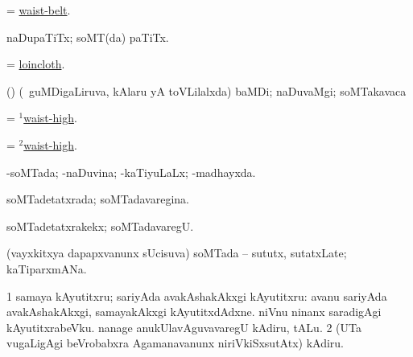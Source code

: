 \bentry
{} 
\gl{\nA}
\expl{}
\bmng
= \hyperlink{waist-belt}{waist-belt}. 
\emng
\eentry

\bentry
{} 
\gl{\nA}
\expl{}
\bmng
naDupaTiTx; soMT(da) paTiTx. 
\emng
\eentry

\bentry
{} 
\gl{\nA}
\expl{}
\bmng
= \hyperref{kandict_l.pdf}{L}{loincloth}{loincloth}. 
\emng
\eentry

\bentry
{} 
\gl{\nA}
\expl{}
\bmng
(\birx) (\sA\ guMDigaLiruva, kAlaru yA toVLilalxda) baMDi; naDuvaMgi; soMTakavaca 
\emng
\eentry

\bentry
{} 
\gl{\gu}
\expl{}
\bmng
= \hyperlink{waist-high(1)}{$^1$waist-high}. 
\emng
\eentry

\bentry
{} 
\gl{\kirxvi}
\expl{}
\bmng
= \hyperlink{waist-high(2)}{$^2$waist-high}. 
\emng
\eentry

\bentry
{}
\gl{\gu}
\expl{}
\bmng
-soMTada; -naDuvina; -kaTiyuLaLx; -madhayxda. 
\emng
\eentry

\bentry
{} 
\gl{\gu}
\expl{}
\bmng
soMTadetatxrada; soMTadavaregina. 
\emng
\eentry

\bentry
{} 
\gl{\kirxvi}
\expl{}
\bmng
soMTadetatxrakekx; soMTadavaregU. 
\emng
\eentry

\bentry
{} 
\gl{\nA}
\expl{}
\bmng
(vayxkitxya dapapxvanunx sUcisuva) soMTada -- sututx, sutatxLate; kaTiparxmANa. 
\emng
\eentry

\bentry
{} 
\gl{\sakirx}
\expl{}
\bmng
\bnum
\num{1} samaya kAyutitxru; sariyAda avakAshakAkxgi kAyutitxru:  avanu sariyAda avakAshakAkxgi, samayakAkxgi kAyutitxdAdxne.  niVnu ninanx saradigAgi kAyutitxrabeVku.  nanage anukUlavAguvavaregU kAdiru, tALu. 
\num{2} (UTa \mo vugaLigAgi beVrobabxra Agamanavanunx niriVkiSxsutAtx) kAdiru. 
\enum
\emng

